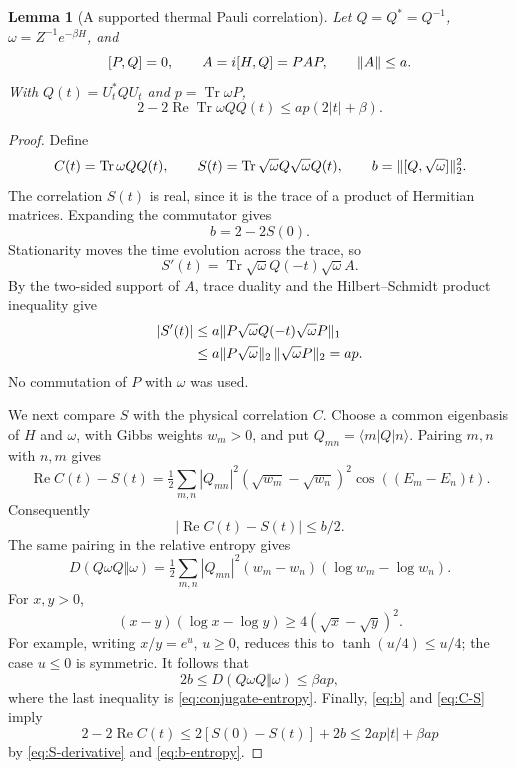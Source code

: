 \documentclass[11pt,reqno]{amsart}
\numberwithin{equation}{section}
\newtheorem{lemma}[theorem]{Lemma}
\theoremstyle{definition}
\theoremstyle{remark}
\newcommand{\Tr}{\operatorname{Tr}}
\newcommand{\Rea}{\operatorname{Re}}
\DeclarePairedDelimiter{\norm}{\lVert}{\rVert}
\begin{document}
\begin{lemma}[A supported thermal Pauli correlation]\label{lem:thermal}
Let \(Q=Q^*=Q^{-1}\), \(\omega=Z^{-1}e^{-\beta H}\), and
\[
 [P,Q]=0,\qquad A=i[H,Q]=PAP,\qquad \norm A\le a.
\]
With \(Q(t)=U_t^*QU_t\) and \(p=\Tr\omega P\),
\begin{equation}\label{eq:thermal-correlation}
             2-2\Rea\Tr\omega Q Q(t)
                         \le ap(2|t|+\beta).
\end{equation}
\end{lemma}
\begin{proof}
Define
\[
 C(t)=\Tr\omega QQ(t),\qquad
 S(t)=\Tr\sqrt\omega Q\sqrt\omega Q(t),\qquad
 b=\norm{[Q,\sqrt\omega]}_2^2.
\]
The correlation \(S(t)\) is real, since it is the trace of a product
of Hermitian matrices. Expanding the commutator gives
\begin{equation}\label{eq:b}
                    b=2-2S(0).
\end{equation}
Stationarity moves the time evolution across the trace, so
\[
 S'(t)=\Tr\sqrt\omega Q(-t)\sqrt\omega A.
\]
By the two-sided support of \(A\), trace duality and the
Hilbert--Schmidt product inequality give
\begin{align}
 |S'(t)|
 &\le a\norm{P\sqrt\omega Q(-t)\sqrt\omega P}_1 \notag\\
 &\le a\norm{P\sqrt\omega}_2\,\norm{\sqrt\omega P}_2
   =ap .                                                   \label{eq:S-derivative}
\end{align}
No commutation of \(P\) with \(\omega\) was used.

We next compare \(S\) with the physical correlation \(C\).
Choose a common eigenbasis of \(H\) and \(\omega\), with Gibbs
weights \(w_m>0\), and put \(Q_{mn}=\langle m|Q|n\rangle\).
Pairing \(m,n\) with \(n,m\) gives
\[
 \Rea C(t)-S(t)
  =\tfrac12\sum_{m,n}|Q_{mn}|^2
       (\sqrt{w_m}-\sqrt{w_n})^2
                  \cos((E_m-E_n)t).
\]
Consequently
\begin{equation}\label{eq:C-S}
                         |\Rea C(t)-S(t)|\le b/2.
\end{equation}
The same pairing in the relative entropy gives
\[
 D(Q\omega Q\Vert\omega)
 =\tfrac12\sum_{m,n}|Q_{mn}|^2
       (w_m-w_n)(\log w_m-\log w_n).
\]
For \(x,y>0\),
\[
 (x-y)(\log x-\log y)\ge4(\sqrt x-\sqrt y)^2.
\]
For example, writing \(x/y=e^u\), \(u\ge0\), reduces this to
\(\tanh(u/4)\le u/4\); the case \(u\le0\) is symmetric.
It follows that
\begin{equation}\label{eq:b-entropy}
        2b\le D(Q\omega Q\Vert\omega)\le\beta ap,
\end{equation}
where the last inequality is \eqref{eq:conjugate-entropy}.
Finally, \eqref{eq:b} and \eqref{eq:C-S} imply
\[
 2-2\Rea C(t)
 \le 2[S(0)-S(t)]+2b
 \le 2ap|t|+\beta ap
\]
by \eqref{eq:S-derivative} and \eqref{eq:b-entropy}.
\end{proof}
\end{document}
